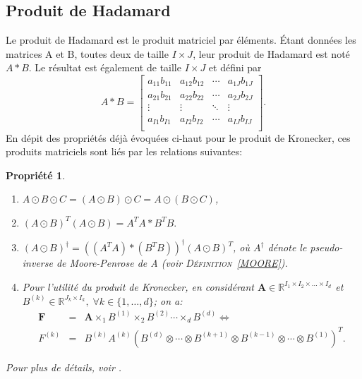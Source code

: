 \documentclass[11pt,a4paper,oneside]{book}
\newtheorem{propp}{Propriété}[chapter]
\def\R{\mathbb R}
\def\RItd{\mathbb{R}^{I_1 \times I_2 \times \ldots \times I_d}}
\newcommand{\mbf}[1]{\mathbf{#1}}
\newcommand{\defref}[1]{\textsc{Définition}~\ref{#1}}
\begin{document}
\subsection{Produit de Hadamard}
Le produit de Hadamard est le produit matriciel par éléments. Étant données les matrices A et 
B, toutes deux de taille $ I\times J $, leur produit de Hadamard est noté $ A\ast B $. Le résultat est également de taille $ I\times J $ et défini par
\begin{equation}
A\ast B=\begin{bmatrix}
a_{11}b_{11}&a_{12}b_{12}&\cdots&a_{1J}b_{1J}\\
a_{21}b_{21}&a_{22}b_{22}&\cdots&a_{2J}b_{2J}\\
\vdots&\vdots&\ddots&\vdots\\
a_{I1}b_{I1}&a_{I2}b_{I2}&\cdots&a_{IJ}b_{IJ}\\
\end{bmatrix}.
\end{equation}
En dépit des propriétés déjà évoquées ci-haut pour le produit de Kronecker, ces produits matriciels sont liés par les relations suivantes:
\begin{propp}\emph{\\}
	\begin{enumerate}
	\item[$ (1) $]$ A\odot B\odot C=(A\odot B)\odot C=A\odot(B\odot C) $,
	\item[$ (2) $]$ (A\odot B)^{T}(A\odot B)=A^{T}A\ast B^{T}B. $
	\item[$ (3) $]
	$ (A\odot B)^{\dagger}=\left((A^{T}A)\ast(B^{T}B)\right)^{\dagger}(A\odot B)^{T} $, où $ A^{\dagger} $ dénote le pseudo-inverse de Moore-Penrose de A (voir \defref{MOORE}).
	
	\item[$ (4) $]
	Pour l'utilité du produit de Kronecker, en considérant $ \mbf{A}\in\RItd $ et $ B^{(k)}\in\R^{J_{k}\times I_{k}},\; \forall k\in\{1,\dots,d\} $; on a:
	\begin{eqnarray}
	\mbf{F}&=&\mbf{A}\times_{1}B^{(1)}\times_{2}B^{(2)}\cdots\times_{d}B^{(d)}\Leftrightarrow\nonumber\\
	F^{(k)}&=&B^{(k)}A^{(k)}\left(B^{(d)}\otimes\cdots\otimes B^{(k+1)}\otimes B^{(k-1)}\otimes\cdots\otimes B^{(1)}\right)^{T}.\nonumber
	\end{eqnarray}
	\end{enumerate}
Pour plus de détails, voir \cite[p.462]{Hong2008}.
\end{propp} 
\end{document}
